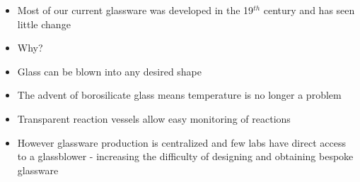 \documentclass[10pt, compress]{beamer}
\begin{document}

\begin{frame}[fragile]
\begin{itemize}
	\item{ Most of our current glassware was developed in the 19$^{th}$ century and has seen little change}
    \item{Why?}
    \item{Glass can be blown into any desired shape}
    \item{The advent of borosilicate glass means temperature is no longer a problem}
    \item{Transparent reaction vessels allow easy monitoring of reactions}
    \item{\color{red}However glassware production is centralized and few labs have direct access to a glassblower - increasing the difficulty of designing and obtaining bespoke glassware} 
\end{itemize}
\end{frame}
\end{document}
